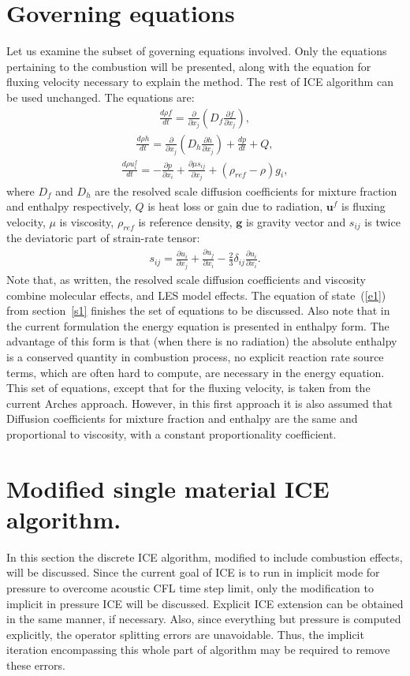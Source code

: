 \documentclass[fleqn,reqno]{amsart}
\newcommand{\pdd}[2]{\frac{\partial{#1}}{\partial{#2}}}
\newcommand{\ldd}[2]{\frac{d{#1}}{d{#2}}}
\begin{document}
\section{Governing equations}
\label{s2}
Let us examine the subset of governing equations involved. Only the equations
pertaining to the combustion will be presented, along with the equation for
fluxing velocity necessary to explain the method. The rest of ICE algorithm
can be used unchanged. The equations are: 
\begin{align}
\label{e4}
\ldd{\rho f}{t}=\pdd{}{x_j}\left(D_f \pdd{f}{x_j}\right),
\end{align}
\begin{align}
\label{e5}
\ldd{\rho h}{t}=\pdd{}{x_j}\left(D_h \pdd{h}{x_j}\right)+\ldd{p}{t}+Q,
\end{align}
\begin{align}
\label{e6}
\ldd{\rho u^f_i}{t}=-\pdd{p}{x_i}+\pdd{\mu s_{ij}}{x_j}+(\rho_{ref}-\rho)g_i,
\end{align}
where $D_f$ and $D_h$ are the resolved scale diffusion coefficients for mixture fraction and enthalpy respectively,
$Q$ is heat loss or gain due to radiation, $\boldsymbol{u}^f$ is fluxing velocity, $\mu$ is viscosity,
$\rho_{ref}$ is reference density, $\boldsymbol{g}$ is gravity vector and $s_{ij}$ is twice the deviatoric
part of strain-rate tensor:
\begin{align}
\label{e7}
s_{ij}=\pdd{u_i}{x_j}+\pdd{u_j}{x_i}-\frac{2}{3}\delta_{ij}\pdd{u_i}{x_i}.
\end{align}
Note that, as written, the resolved scale diffusion coefficients and viscosity combine molecular effects, and LES model effects.
The equation of state~(\ref{e1}) from section~\ref{s1} finishes the set of equations to be discussed.
Also note that in the current formulation
the energy equation is presented in enthalpy form. The advantage of this form is that
(when there is no radiation) the absolute enthalpy is a conserved quantity in combustion process,
no explicit reaction rate source terms, which are often hard to compute,
are necessary in the energy equation. This set of equations, except that for the
fluxing velocity, is taken from the current Arches approach. However, in this first approach
it is also assumed that Diffusion coefficients for mixture fraction and enthalpy
are the same and proportional to viscosity, with a constant proportionality
coefficient.

\section{Modified single material ICE algorithm.}
\label{s3}
In this section the discrete ICE algorithm, modified to include combustion effects,
will be discussed. Since the current goal of ICE is to run in implicit
mode for pressure to overcome acoustic CFL time step limit, only the modification
to implicit in pressure ICE will be discussed. Explicit ICE extension can be
obtained in the same manner, if necessary. Also, since everything but pressure
is computed explicitly, the operator splitting errors are unavoidable. Thus,
the implicit iteration encompassing this whole part of algorithm may be
required to remove these errors.
\end{document}
